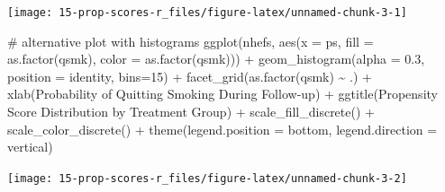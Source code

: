 \documentclass[
  10pt,
  a4paper,
]{book}
\newenvironment{Shaded}{\begin{snugshade}}{\end{snugshade}}
\newcommand{\AttributeTok}[1]{\textcolor[rgb]{0.40,0.45,0.13}{#1}}
\newcommand{\CommentTok}[1]{\textcolor[rgb]{0.37,0.37,0.37}{#1}}
\newcommand{\DecValTok}[1]{\textcolor[rgb]{0.68,0.00,0.00}{#1}}
\newcommand{\FloatTok}[1]{\textcolor[rgb]{0.68,0.00,0.00}{#1}}
\newcommand{\FunctionTok}[1]{\textcolor[rgb]{0.28,0.35,0.67}{#1}}
\newcommand{\NormalTok}[1]{\textcolor[rgb]{0.00,0.46,0.62}{#1}}
\newcommand{\SpecialCharTok}[1]{\textcolor[rgb]{0.37,0.37,0.37}{#1}}
\newcommand{\StringTok}[1]{\textcolor[rgb]{0.13,0.47,0.30}{#1}}
\begin{document}
\begin{center}\texttt{[image: 15-prop-scores-r\_files/figure-latex/unnamed-chunk-3-1]} \end{center}

\begin{Shaded}
\begin{Highlighting}[]

\CommentTok{\# alternative plot with histograms}
\FunctionTok{ggplot}\NormalTok{(nhefs, }\FunctionTok{aes}\NormalTok{(}\AttributeTok{x =}\NormalTok{ ps, }\AttributeTok{fill =} \FunctionTok{as.factor}\NormalTok{(qsmk), }\AttributeTok{color =} \FunctionTok{as.factor}\NormalTok{(qsmk))) }\SpecialCharTok{+}
  \FunctionTok{geom\_histogram}\NormalTok{(}\AttributeTok{alpha =} \FloatTok{0.3}\NormalTok{, }\AttributeTok{position =} \StringTok{\textquotesingle{}identity\textquotesingle{}}\NormalTok{, }\AttributeTok{bins=}\DecValTok{15}\NormalTok{) }\SpecialCharTok{+}
  \FunctionTok{facet\_grid}\NormalTok{(}\FunctionTok{as.factor}\NormalTok{(qsmk) }\SpecialCharTok{\textasciitilde{}}\NormalTok{ .) }\SpecialCharTok{+}
  \FunctionTok{xlab}\NormalTok{(}\StringTok{\textquotesingle{}Probability of Quitting Smoking During Follow{-}up\textquotesingle{}}\NormalTok{) }\SpecialCharTok{+}
  \FunctionTok{ggtitle}\NormalTok{(}\StringTok{\textquotesingle{}Propensity Score Distribution by Treatment Group\textquotesingle{}}\NormalTok{) }\SpecialCharTok{+}
  \FunctionTok{scale\_fill\_discrete}\NormalTok{(}\StringTok{\textquotesingle{}\textquotesingle{}}\NormalTok{) }\SpecialCharTok{+}
  \FunctionTok{scale\_color\_discrete}\NormalTok{(}\StringTok{\textquotesingle{}\textquotesingle{}}\NormalTok{) }\SpecialCharTok{+}
  \FunctionTok{theme}\NormalTok{(}\AttributeTok{legend.position =} \StringTok{\textquotesingle{}bottom\textquotesingle{}}\NormalTok{, }\AttributeTok{legend.direction =} \StringTok{\textquotesingle{}vertical\textquotesingle{}}\NormalTok{)}
\end{Highlighting}
\end{Shaded}

\begin{center}\texttt{[image: 15-prop-scores-r\_files/figure-latex/unnamed-chunk-3-2]} \end{center}
\end{document}
